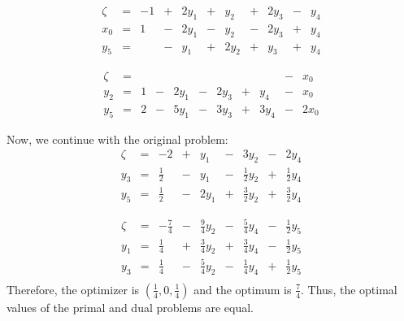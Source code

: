 \documentclass[letterpaper,12pt]{article}
\theoremstyle{definition}
\begin{document}
\begin{equation*}
\begin{matrix}
\zeta &=&-1&+&2y_1&+&y_2&+&2y_3&-&y_4 \\
\hline
x_0 &=&1 &-& 2y_1 &-& y_2 &-& 2y_3 &+& y_4  \\
y_5 &=& &-& y_1 &+&2y_2 &+&y_3&+& y_4
\end{matrix}
\end{equation*}

\begin{equation*}
\begin{matrix}
\zeta &= & & & & & & & &-& x_0 \\
\hline
y_2 &=&1 &-& 2y_1 &-& 2y_3 &+& y_4 &-& x_0  \\
y_5 &=&2&-&5y_1 &-&3y_3 &+&3y_4&-& 2x_0
\end{matrix}
\end{equation*}

Now, we continue with the original problem:
\begin{equation*}
\begin{matrix}
\zeta &=&-2&+&y_1&-&3y_2&-&2y_4 \\
\hline
y_3 &=&\frac{1}{2} &-& y_1 &-& \frac{1}{2} y_2 &+& \frac{1}{2}y_4  \\
y_5 &=&\frac{1}{2} &-&2y_1 &+&\frac{3}{2} y_2 &+&\frac{3}{2} y_4
\end{matrix}
\end{equation*}

\begin{equation*}
\begin{matrix}
\zeta &=&-\frac{7}{4}&-&\frac{9}{4} y_2&-&\frac{5}{4} y_4&-&\frac{1}{2} y_5 \\
\hline
y_1 &=&\frac{1}{4} &+&\frac{3}{4} y_2 &+&\frac{3}{4} y_4 &-&\frac{1}{2} y_5 \\
y_3 &=&\frac{1}{4} &-& \frac{5}{4} y_2 &-& \frac{1}{4} y_4 &+& \frac{1}{2}y_5  \\
\end{matrix}
\end{equation*}
Therefore, the optimizer is $(\frac{1}{4}, 0, \frac{1}{4})$ and the optimum is $\frac{7}{4}$.  Thus, the optimal values of the primal and dual problems are equal. 
\end{document}
